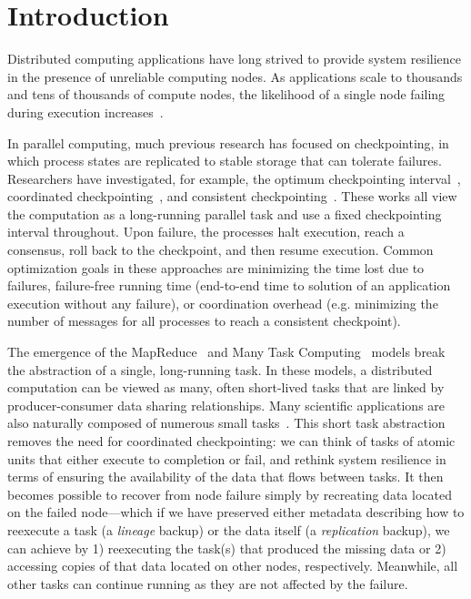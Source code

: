 \documentclass{sig-alternate}
\begin{document}
\section{Introduction}
Distributed computing applications have long strived to provide system resilience in the 
presence of unreliable computing nodes. As applications scale to thousands and tens of thousands of 
compute nodes, the likelihood of a single node failing during execution increases~\cite{gfs2003, exaroadmap2011}. 

In parallel computing, much previous research has focused on checkpointing, in which process states are replicated to stable storage that can tolerate failures. Researchers have investigated, for example, the optimum checkpointing interval~\cite{young1974first, daly2006higher}, coordinated checkpointing~\cite{chandy1985distributed}, and consistent checkpointing~\cite{elnozahy1992performance}. These works all view the computation as a long-running parallel task and use a fixed checkpointing interval throughout. 
Upon failure, the processes halt execution, reach a consensus, roll back to the checkpoint, and then resume execution. 
Common optimization goals in these approaches are minimizing the time lost due to failures, failure-free running time (end-to-end time to solution of an application execution without any failure), or coordination overhead (e.g. minimizing the number of messages for all processes to reach a consistent checkpoint). 

The emergence of the MapReduce~\cite{mapreduce-04} and Many Task Computing~\cite{raicu08} models
break the abstraction of a single, long-running task. In these models, a distributed computation can be viewed as many, often short-lived tasks 
that are linked by producer-consumer data sharing relationships.
Many scientific applications are also naturally composed of numerous small tasks~\cite{FALKON-SC-08}. 
This short task abstraction removes the need for coordinated checkpointing: we can think of tasks of atomic units that either execute to completion
or fail, and rethink system resilience in terms of ensuring the availability of the data that flows between tasks.
It then becomes possible to recover from node failure simply by recreating data located on the failed node---which
if we have preserved either metadata describing how to reexecute a task (a {\em lineage} backup) or the data itself (a {\em replication} backup),
we can achieve by 1) reexecuting the task(s) that produced the missing data or 2) accessing copies of that data located on other nodes, respectively.
Meanwhile, all other tasks can continue running as they are not affected by the failure.
\end{document}
